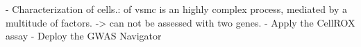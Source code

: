 - Characterization of cells.: of \ac{vsmc} is an highly complex process, mediated by a multitude of factors. -> can not be assessed with two genes.
- Apply the CellROX assay
- Deploy the GWAS Navigator
